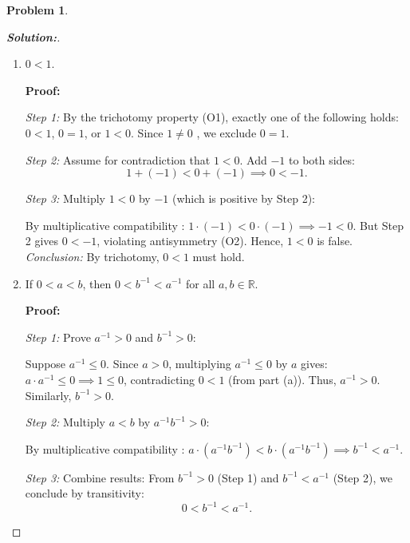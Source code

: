 \documentclass[12pt]{article}
\theoremstyle{definition}\newtheorem{problem}{Problem}
\newenvironment{solution}{\begin{proof}[\bfseries\textup{Solution:}]}{\end{proof}}
\begin{document}
\newpage
\begin{problem}
\end{problem}
\begin{solution}
\begin{enumerate}
            \item $0 < 1$.
            
            \textbf{Proof:}

                 \textit{Step 1:} By the trichotomy property (O1), exactly one of the following holds:  
                $0 < 1$, $0 = 1$, or $1 < 0$.  
                Since $1 \neq 0$ , we exclude $0 = 1$.
                
                 \textit{Step 2:} Assume for contradiction that $1 < 0$.  
                Add $-1$ to both sides:  
                $$1 + (-1) < 0 + (-1) \implies 0 < -1.$$
                
                 \textit{Step 3:} Multiply $1 < 0$ by $-1$ (which is positive by Step 2):  
                
                By multiplicative compatibility :  
                $1 \cdot (-1) < 0 \cdot (-1) \implies -1 < 0$.  
                But Step 2 gives $0 < -1$, violating antisymmetry (O2).  
                Hence, $1 < 0$ is false.
\\

                \textit{Conclusion:} By trichotomy, $0 < 1$ must hold.
\\      

\item If $0 < a < b$, then $0 < b^{-1} < a^{-1}$ for all $a, b \in \mathbb{R}$.
            
            \textbf{Proof:}

   \textit{Step 1:} Prove $a^{-1} > 0$ and $b^{-1} > 0$:  
                
                Suppose $a^{-1} \leq 0$. Since $a > 0$, multiplying $a^{-1} \leq 0$ by $a$ gives:  
                $a \cdot a^{-1} \leq 0 \implies 1 \leq 0$, contradicting $0 < 1$ (from part (a)).  
                Thus, $a^{-1} > 0$. Similarly, $b^{-1} > 0$.
                
 \textit{Step 2:} Multiply $a < b$ by $a^{-1}b^{-1} > 0$:  
                
                By multiplicative compatibility :  
                $a \cdot (a^{-1}b^{-1}) < b \cdot (a^{-1}b^{-1}) \implies b^{-1} < a^{-1}$.
                
\textit{Step 3:} Combine results:  
                From $b^{-1} > 0$ (Step 1) and $b^{-1} < a^{-1}$ (Step 2), we conclude by transitivity:  
                $$0 < b^{-1} < a^{-1}.$$

\end{enumerate}
\end{solution}
\end{document}
